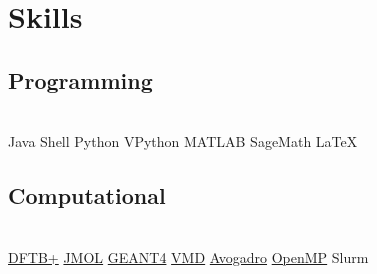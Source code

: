 \documentclass[]{deedy-resume-openfont}
\begin{document}
\begin{minipage}[t]{0.44\textwidth}

\section{Skills}
\vspace{3}
\subsection{Programming} \\
\textbullet{}Java \textbullet{}   Shell \textbullet{} Python \textbullet{} VPython \textbullet{} MATLAB \textbullet{} SageMath \textbullet{} \LaTeX\ 
\newline
\subsection{Computational} \\
\textbullet{}
\href{https://www.dftbplus.org/}{DFTB+} \textbullet{}   \href{http://www.jmol.org/}{JMOL} \textbullet{} \href{https://geant4.web.cern.ch/}{GEANT4}  \textbullet{} \href{https://www.ks.uiuc.edu/Research/vmd/}{VMD} \textbullet{} \href{https://avogadro.cc/}{Avogadro}  \textbullet{} \href{https://www.openmp.org/}{OpenMP}\textbullet{} Slurm  \\ 


\end{minipage}
\end{document}
